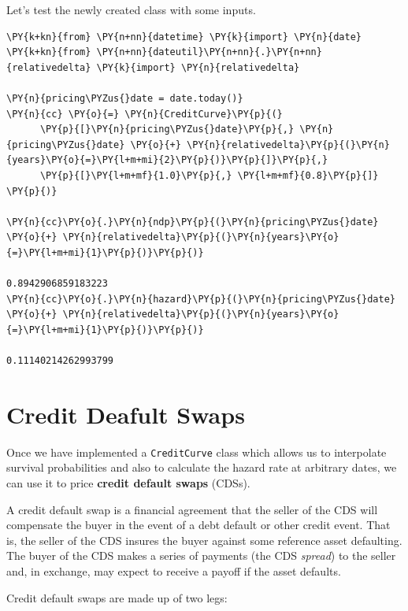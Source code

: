 Let's test the newly created class with some inputs.
\begin{tcolorbox}[breakable, size=fbox, boxrule=1pt, pad at break*=1mm,colback=cellbackground, colframe=cellborder]
	\begin{Verbatim}[commandchars=\\\{\}]
\PY{k+kn}{from} \PY{n+nn}{datetime} \PY{k}{import} \PY{n}{date}
\PY{k+kn}{from} \PY{n+nn}{dateutil}\PY{n+nn}{.}\PY{n+nn}{relativedelta} \PY{k}{import} \PY{n}{relativedelta}

\PY{n}{pricing\PYZus{}date = date.today()}        
\PY{n}{cc} \PY{o}{=} \PY{n}{CreditCurve}\PY{p}{(}
      \PY{p}{[}\PY{n}{pricing\PYZus{}date}\PY{p}{,} \PY{n}{pricing\PYZus{}date} \PY{o}{+} \PY{n}{relativedelta}\PY{p}{(}\PY{n}{years}\PY{o}{=}\PY{l+m+mi}{2}\PY{p}{)}\PY{p}{]}\PY{p}{,}
      \PY{p}{[}\PY{l+m+mf}{1.0}\PY{p}{,} \PY{l+m+mf}{0.8}\PY{p}{]}
\PY{p}{)}

\PY{n}{cc}\PY{o}{.}\PY{n}{ndp}\PY{p}{(}\PY{n}{pricing\PYZus{}date} \PY{o}{+} \PY{n}{relativedelta}\PY{p}{(}\PY{n}{years}\PY{o}{=}\PY{l+m+mi}{1}\PY{p}{)}\PY{p}{)}

0.8942906859183223
\PY{n}{cc}\PY{o}{.}\PY{n}{hazard}\PY{p}{(}\PY{n}{pricing\PYZus{}date} \PY{o}{+} \PY{n}{relativedelta}\PY{p}{(}\PY{n}{years}\PY{o}{=}\PY{l+m+mi}{1}\PY{p}{)}\PY{p}{)}

0.11140214262993799
\end{Verbatim}
\end{tcolorbox}    
            
\section{Credit Deafult Swaps}\label{credit-deafult-swaps}

Once we have implemented a \texttt{CreditCurve} class which allows us to
interpolate survival probabilities and also to calculate the hazard rate at arbitrary
dates, we can use it to price \textbf{credit default swaps} (CDSs).

A credit default swap is a financial agreement that the seller of the CDS will compensate the buyer in the event of a debt default or other credit event. 
That is, the seller of the CDS insures the buyer against some reference asset defaulting. The buyer of the CDS makes a series of payments (the CDS \emph{spread}) to the seller and, in exchange, may expect to receive a payoff if the asset defaults.

Credit default swaps are made up of two legs:

